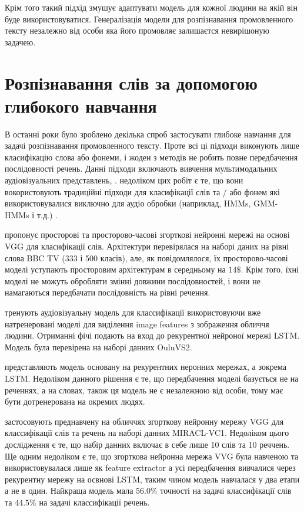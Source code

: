 Крім того такий підхід змушує адаптувати модель для кожної людини на якій він буде використовуватися. Генералізація 
модели для розпізнавання промовленного тексту незалежно від особи яка його промовляє залишаєтся невирішоную задачею.

\section{Розпізнавання слів за допомогою глибокого навчання}

В останні роки було зроблено декілька спроб застосувати глибоке навчання для задачі розпізнавання промовленного тексту.
Проте всі ці підходи виконують лише класифікацію слова або фонеми, і жоден з методів не робить повне передбачення послідовності речень.
Данні підходи включають вивчення мультимодальних аудіовізуальних представлень,
 \cite{ngiam2011multimodal, sui2015listening, petridis2016deep}.
недоліком цих робіт є те, що вони вокористовують традиційні підходи для класифікації слів та / або фонем 
які використовувалися виключно для аудіо обробки (наприклад, HMMs, GMM-HMMs і т.д.) 
\cite{almajai:2016, takashima2016audio, noda2014lipreading, koller2015deep}.

\cite{chung2016lip} пропонує просторові та просторово-часові згорткові нейронні мережі на основі VGG для класифікації слів. 
Архітектури перевірялася на наборі даних на рівні слова BBC TV (333 і 500 класів), але, як повідомлялося, їх просторово-часові 
моделі уступають просторовим архітектурам в середньому на $ 14 \$$. Крім того, їхні моделі не можуть обробляти 
змінні довжини послідовностей, і вони не намагаються передбачати послідовність на рівні речення.

\cite{chung2016out} тренують аудіовізуальну модель для классифікації використовуючи вже натренеровані моделі для виділення
image features з зображення обличчя людини. Отриманні фічі подають на вход до рекурентної нейроної мережі LSTM. Модель була 
перевірена на наборі данних OuluVS2.

\cite{wand2016lipreading} представляють модель основану на рекурентних неронних мережах, а зокрема LSTM. Недоліком данного
рішення є те, що передбачення моделі базується не на реченнях, а на словах, також ця модель не є незалежною від особи, тому
має бути дотренерована на окремих людях.

\cite{garglip} застосовують преднавчену на обличчях згорткову нейронну мережу VGG для классифікації слів та речень
на наборі данних MIRACL-VC1. Недоліком цього дослідження є те, що набір данних включає в себе лише 10 слів та 
10 реччень. Ще одним недоліком є те, що згорткова нейронна мережа VVG була навченою та використовувалася лише як
feature extractor а усі передбачення вивчалися через рекурентну мережу на освнові LSTM, таким чином модель навчалася у два
етапи а не в один. Найкраща модель мала $56.0\%$ точності на задачі классифікації слів та $44.5\%$ на задачі классифікації 
речень.

